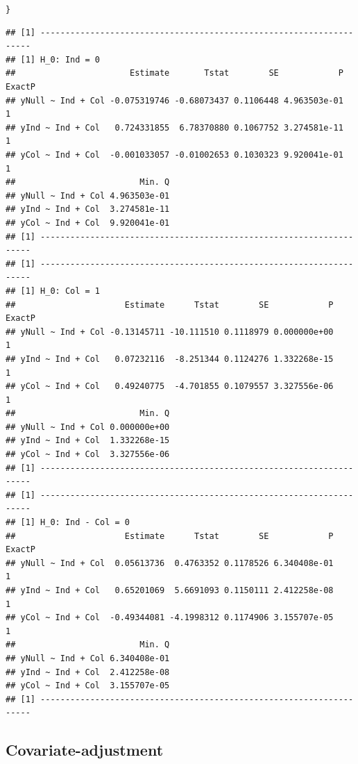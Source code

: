 \documentclass[11pt, a4paper]{article}\usepackage[]{graphicx}\usepackage[]{color}
\makeatletter
\newcommand{\hlstd}[1]{\textcolor[rgb]{0.345,0.345,0.345}{#1}}%
\newenvironment{kframe}{%
 \def\at@end@of@kframe{}%
 \ifinner\ifhmode%
  \def\at@end@of@kframe{\end{minipage}}%
  \begin{minipage}{\columnwidth}%
 \fi\fi%
 \def\FrameCommand##1{\hskip\@totalleftmargin \hskip-\fboxsep
 \colorbox{shadecolor}{##1}\hskip-\fboxsep
     \hskip-\linewidth \hskip-\@totalleftmargin \hskip\columnwidth}%
 \MakeFramed {\advance\hsize-\width
   \@totalleftmargin\z@ \linewidth\hsize
   \@setminipage}}%
 {\par\unskip\endMakeFramed%
 \at@end@of@kframe}
\newenvironment{knitrout}{}{} %
\makeatother
\begin{document}
\begin{knitrout}
\begin{kframe}
\begin{alltt}
    \hlstd{\}}
\end{alltt}
\begin{verbatim}
## [1] --------------------------------------------------------------------
## [1] H_0: Ind = 0
##                       Estimate       Tstat        SE            P ExactP
## yNull ~ Ind + Col -0.075319746 -0.68073437 0.1106448 4.963503e-01      1
## yInd ~ Ind + Col   0.724331855  6.78370880 0.1067752 3.274581e-11      1
## yCol ~ Ind + Col  -0.001033057 -0.01002653 0.1030323 9.920041e-01      1
##                         Min. Q
## yNull ~ Ind + Col 4.963503e-01
## yInd ~ Ind + Col  3.274581e-11
## yCol ~ Ind + Col  9.920041e-01
## [1] --------------------------------------------------------------------
## [1] --------------------------------------------------------------------
## [1] H_0: Col = 1
##                      Estimate      Tstat        SE            P ExactP
## yNull ~ Ind + Col -0.13145711 -10.111510 0.1118979 0.000000e+00      1
## yInd ~ Ind + Col   0.07232116  -8.251344 0.1124276 1.332268e-15      1
## yCol ~ Ind + Col   0.49240775  -4.701855 0.1079557 3.327556e-06      1
##                         Min. Q
## yNull ~ Ind + Col 0.000000e+00
## yInd ~ Ind + Col  1.332268e-15
## yCol ~ Ind + Col  3.327556e-06
## [1] --------------------------------------------------------------------
## [1] --------------------------------------------------------------------
## [1] H_0: Ind - Col = 0
##                      Estimate      Tstat        SE            P ExactP
## yNull ~ Ind + Col  0.05613736  0.4763352 0.1178526 6.340408e-01      1
## yInd ~ Ind + Col   0.65201069  5.6691093 0.1150111 2.412258e-08      1
## yCol ~ Ind + Col  -0.49344081 -4.1998312 0.1174906 3.155707e-05      1
##                         Min. Q
## yNull ~ Ind + Col 6.340408e-01
## yInd ~ Ind + Col  2.412258e-08
## yCol ~ Ind + Col  3.155707e-05
## [1] --------------------------------------------------------------------
\end{verbatim}
\end{kframe}
\end{knitrout}

    \subsection{Covariate-adjustment}
\end{document}
